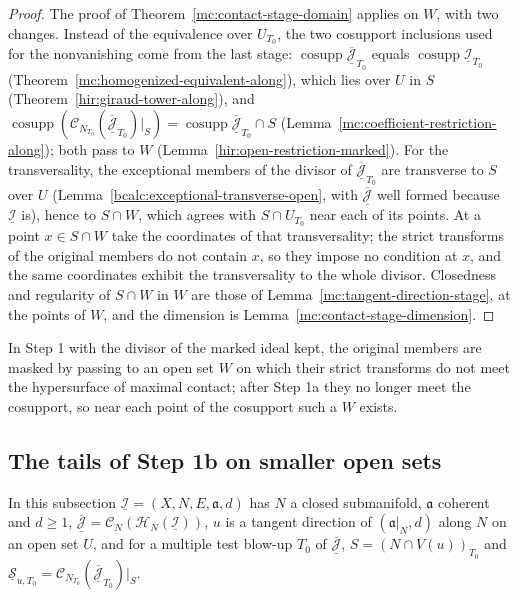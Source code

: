 \begin{proof}
\leanok
The proof of Theorem~\ref{mc:contact-stage-domain} applies on \(W\), with two changes. Instead of the equivalence over \(U_{T_0}\), the two cosupport inclusions used for
the nonvanishing come from the last stage: \(\operatorname{cosupp}\overline{\underline{\mathcal J}}_{T_0}\) equals \(\operatorname{cosupp}\underline{\mathcal I}_{T_0}\)
(Theorem~\ref{mc:homogenized-equivalent-along}), which lies over \(U\) in \(S\) (Theorem~\ref{hir:giraud-tower-along}), and
\(\operatorname{cosupp}(\mathcal C_{N_{T_0}}(\overline{\underline{\mathcal J}}_{T_0})|_S)=\operatorname{cosupp}\overline{\underline{\mathcal J}}_{T_0}\cap S\) (Lemma~\ref{mc:coefficient-restriction-along});
both pass to \(W\) (Lemma~\ref{hir:open-restriction-marked}). For the transversality, the exceptional members of the divisor of \(\overline{\underline{\mathcal J}}_{T_0}\) are
transverse to \(S\) over \(U\) (Lemma~\ref{bcalc:exceptional-transverse-open}, with \(\overline{\underline{\mathcal J}}\) well formed because \(\underline{\mathcal I}\) is), hence to
\(S\cap W\), which agrees with \(S\cap U_{T_0}\) near each of its points. At a point \(x\in S\cap W\) take the coordinates of that transversality; the strict transforms of the
original members do not contain \(x\), so they impose no condition at \(x\), and the same coordinates exhibit the transversality to the whole divisor. Closedness and
regularity of \(S\cap W\) in \(W\) are those of Lemma~\ref{mc:tangent-direction-stage}, at the points of \(W\), and the dimension is Lemma~\ref{mc:contact-stage-dimension}.
\end{proof}
In Step 1 with the divisor of the marked ideal kept, the original members are masked by passing to an open set \(W\) on which their strict transforms do not meet
the hypersurface of maximal contact; after Step 1a they no longer meet the cosupport, so near each point of the cosupport such a \(W\) exists.

\subsection{The tails of Step 1b on smaller open sets}

In this subsection \(\underline{\mathcal I}=(X,N,E,\mathfrak a,d)\) has \(N\) a closed submanifold, \(\mathfrak a\) coherent and \(d\ge1\),
\(\overline{\underline{\mathcal J}}=\mathcal C_N(\mathcal H_N(\underline{\mathcal I}))\), \(u\) is a tangent direction of \((\mathfrak a|_N,d)\) along \(N\) on an open set \(U\),
and for a multiple test blow-up \(T_0\) of \(\overline{\underline{\mathcal J}}\), \(S=(N\cap V(u))_{T_0}\) and
\(\underline{\mathcal S}_{u,T_0}=\mathcal C_{N_{T_0}}(\overline{\underline{\mathcal J}}_{T_0})|_S\).

